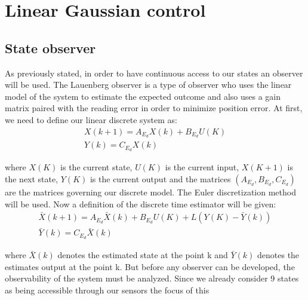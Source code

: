 \documentclass[conference]{IEEEtran}
\begin{document}
\section{Linear Gaussian control}

\subsection{State observer}
As previously stated, in order to have continuous access to our states an
observer will be used. The Lauenberg observer is a type of observer who uses
the linear model of the system to estimate the expected outcome and also uses a
gain matrix paired with the reading error in order to minimize position error.
At first, we need to define our linear discrete system as:
\begin{align}
    X(k+1)=A_{E_d}X(k)+B_{E_d}U(K) \\
    Y(k)=C_{E_d}X(k)
    \label{LinearDiscreteExtendedSystemFormula}
\end{align}
\par
where $X(K)$ is the current state, $U(K)$ is the current input, $X(K+1)$ is the
next state, $Y(K)$ is the current output and the matrices
$(A_{E_d},B_{E_d},C_{E_d})$ are the matrices governing our discrete model. The
Euler discretization method will be used. Now a definition of the discrete time
estimator will be given:
\begin{align}
    \bar{X}(k+1)=A_{E_d}\bar{X}(k)+B_{E_d}U(K)+L(Y(K)-\bar{Y}(k)) \\
    \bar{Y}(k)=C_{E_d}\bar{X}(k)
    \label{LinearEstimatorDiscreteExtendedSystemFormula}
\end{align}
\par
where $\bar{X}(k)$ denotes the estimated state at the point k and $\bar{Y}(k)$
denotes the estimates output at the point k. But before any observer can be
developed, the observability of the system must be analyzed. Since we already
consider 9 states as being accessible through our sensors the focus of this
\end{document}
